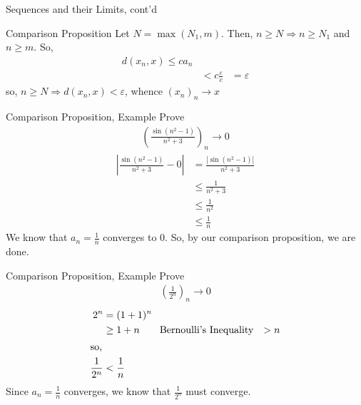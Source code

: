\documentclass[8pt]{extarticle}
\begin{document}
\begin{problem}{Sequences and their Limits, cont'd}
\begin{problem}{Comparison Proposition}
      Let $N = \max(N_1,m)$. Then, $n \geq N\Rightarrow n\geq N_1$ and $n\geq m$. So,
      \begin{align*}
        d(x_n,x) \leq ca_n\\
        &< c\frac{\varepsilon}{c}
        &=\varepsilon
      \end{align*}
      so, $n\geq N \Rightarrow d(x_n,x) < \varepsilon$, whence $(x_n)_n \rightarrow x$
    \end{problem}
    \begin{problem}{Comparison Proposition, Example}
      Prove
      \begin{align*}
        \left(\frac{\sin(n^2-1)}{n^2 + 3}\right)_n \rightarrow 0
      \end{align*}
      \tcblower
      \begin{align*}
        \left|\frac{\sin(n^2 - 1)}{n^2 + 3} - 0\right| &= \frac{|\sin(n^2 - 1)|}{n^2 + 3}\\
                                                       &\leq \frac{1}{n^2 + 3}\\
                                                       &\leq \frac{1}{n^2}\\
                                                       &\leq \frac{1}{n}
      \end{align*}
      We know that $a_n = \frac{1}{n}$ converges to $0$. So, by our comparison proposition, we are done.
      \begin{problem}{Comparison Proposition, Example}
        Prove
        \begin{align*}
          \left(\frac{1}{2^n}\right)_n \rightarrow 0
        \end{align*}
        \tcblower
        \begin{align*}
          2^n &= (1+1)^n\\
              &\geq 1+n\tag*{Bernoulli's Inequality}
              &>n\\
              \shortintertext{so,}
          \frac{1}{2^n} &< \frac{1}{n}
        \end{align*}
        Since $a_n = \frac{1}{n}$ converges, we know that $\frac{1}{2^n}$ must converge.
      \end{problem}
    \end{problem}
  \end{problem}
\end{document}
